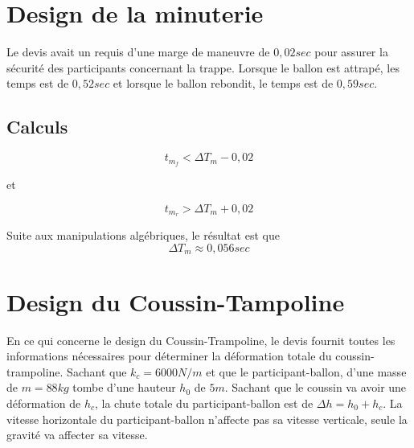 \documentclass[12pt]{article}
\begin{document}
\section{Design de la minuterie}
Le devis avait un requis d'une marge de maneuvre de $0,02sec$ pour assurer la sécurité des participants concernant la trappe. Lorsque le ballon est attrapé, les temps est de $0,52sec$ et lorsque le ballon rebondit, le temps est de $0,59sec$.
\subsection{Calculs}
\begin{equation}
t_{m_f} < \Delta T_m - 0,02
\end{equation}
\begin{center}
et
\end{center}
\begin{equation}
t_{m_r} > \Delta T_m + 0,02
\end{equation}

Suite aux manipulations algébriques, le résultat est que 
\begin{equation}
\Delta T_m \approx 0,056 sec
\end{equation}

\section{Design du Coussin-Tampoline}
En ce qui concerne le design du Coussin-Trampoline, le devis fournit toutes les informations nécessaires pour déterminer la déformation totale du coussin-trampoline. Sachant que $k_c = 6000N/m$ et que le participant-ballon, d'une masse de $m = 88kg$ tombe d'une hauteur $h_0$ de $5 m$. Sachant que le coussin va avoir une déformation de $h_c$, la chute totale du participant-ballon est de $\Delta h = h_0 + h_c$. La vitesse horizontale du participant-ballon n'affecte pas sa vitesse verticale, seule la gravité va affecter sa vitesse.
\end{document}

